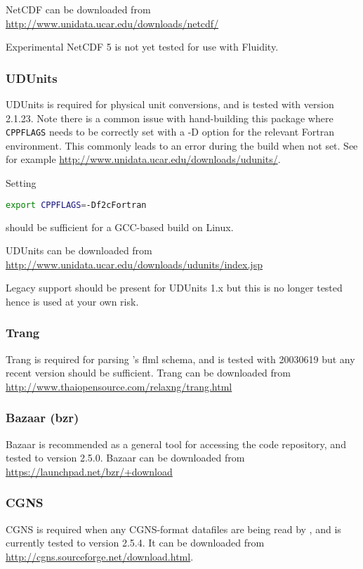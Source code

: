 NetCDF can be downloaded from \url{http://www.unidata.ucar.edu/downloads/netcdf/}

Experimental NetCDF 5 is not yet tested for use with Fluidity.

\subsubsection{UDUnits}
\label{sec:required_libraries_supporting_udunits}

UDUnits is required for physical unit conversions, and is tested with version
2.1.23. Note there is a common issue with hand-building this package where
\lstinline[language=bash]+CPPFLAGS+ needs to be correctly set with a -D
option for the relevant Fortran environment. This commonly leads to an error
during the build when not set. See for example
\url{http://www.unidata.ucar.edu/downloads/udunits/}.

Setting

\begin{lstlisting}[language=bash]
export CPPFLAGS=-Df2cFortran
\end{lstlisting}

should be sufficient for a GCC-based build on Linux.

UDUnits can be downloaded from \url{http://www.unidata.ucar.edu/downloads/udunits/index.jsp}

Legacy support should be present for UDUnits 1.x but this is no longer tested 
hence is used at your own risk.

\subsubsection{Trang}
\label{sec:required_libraries_supporting_trang}

Trang is required for parsing \fluidity's flml schema, and is tested with
20030619 but any recent version should be sufficient. Trang can be downloaded
from \url{http://www.thaiopensource.com/relaxng/trang.html}

\subsubsection{Bazaar (bzr)}
\label{sec:required_libraries_supporting_bzr}

Bazaar is recommended as a general tool for accessing the \fluidity code
repository, and tested to version 2.5.0. Bazaar can be
downloaded from \url{https://launchpad.net/bzr/+download}

\subsubsection{CGNS}
\label{sec:required_libraries_supporting_cgns}

CGNS is required when any CGNS-format datafiles are being read by \fluidity, and
is currently tested to version 2.5.4. It can be downloaded from 
\url{http://cgns.sourceforge.net/download.html}.
